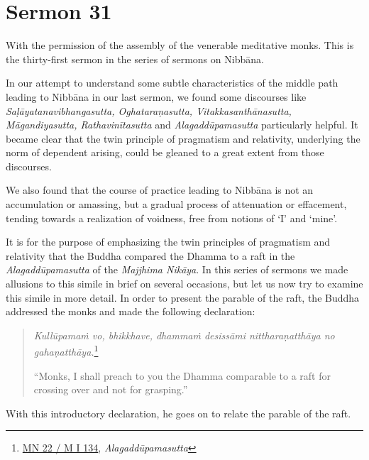 \chapter{Sermon 31}

\NibbanaOpeningQuote

With the permission of the assembly of the venerable meditative monks. This is the thirty-first sermon in the series of sermons on Nibbāna.

In our attempt to understand some subtle characteristics of the middle path leading to Nibbāna in our last sermon, we found some discourses like \emph{Saḷāyatanavibhangasutta, Oghataraṇasutta, Vitakkasanthānasutta, Māgandiyasutta, Rathavinītasutta} and \emph{Alagaddūpamasutta} particularly helpful. It became clear that the twin principle of pragmatism and relativity, underlying the norm of dependent arising, could be gleaned to a great extent from those discourses.

We also found that the course of practice leading to Nibbāna is not an accumulation or amassing, but a gradual process of attenuation or effacement, tending towards a realization of voidness, free from notions of `I' and `mine'.

It is for the purpose of emphasizing the twin principles of pragmatism and relativity that the Buddha compared the Dhamma to a raft in the \emph{Alagaddūpamasutta} of the \emph{Majjhima Nikāya}. In this series of sermons we made allusions to this simile in brief on several occasions, but let us now try to examine this simile in more detail. In order to present the parable of the raft, the Buddha addressed the monks and made the following declaration:

\begin{quote}
\emph{Kullūpamaṁ vo, bhikkhave, dhammaṁ desissāmi nittharaṇatthāya no gahaṇatthāya.}\footnote{\href{https://suttacentral.net/mn22/pli/ms}{MN 22 / M I 134}, \emph{Alagaddūpamasutta}}

``Monks, I shall preach to you the Dhamma comparable to a raft for crossing over and not for grasping.''
\end{quote}

With this introductory declaration, he goes on to relate the parable of the raft.

